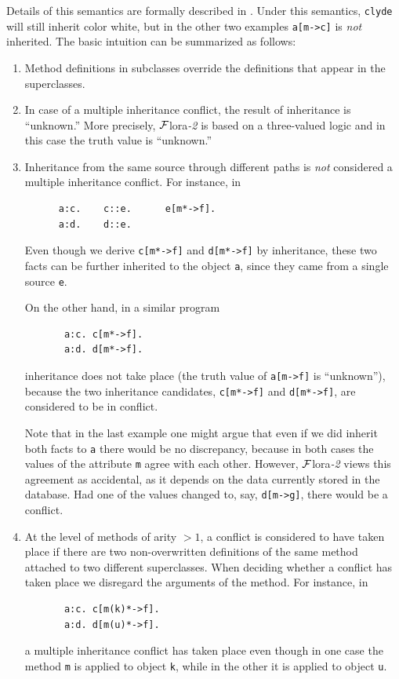 \documentclass[11pt]{article}
\newcommand{\FLORA}{{\mbox{\sc ${\cal F}${lora}\rm\emph{-2}}}\xspace}
\begin{document}
Details of this semantics are formally described in
\cite{inheritance-odbase-02}.  Under this semantics, {\tt clyde} will still
inherit color white, but in the other two examples {\tt a[m->c]} is
\emph{not} inherited.  The basic intuition can be summarized as follows:
\begin{enumerate}
\item  Method definitions in subclasses override the definitions that
  appear in the superclasses.
\item In case of a multiple inheritance conflict, the result of inheritance
  is ``unknown.'' More precisely, \FLORA is based on a three-valued logic and
  in this case the truth value is ``unknown.''
\item  Inheritance from the same source through different paths is
  \emph{not} considered a multiple inheritance conflict. For instance, in
  \begin{verbatim}
      a:c.    c::e.      e[m*->f].    
      a:d.    d::e.
  \end{verbatim}
  Even though we derive {\tt c[m*->f]} and {\tt d[m*->f]} by inheritance,
  these two facts can be further inherited to the object {\tt a}, since
  they came from a single source {\tt e}.

  On the other hand, in a similar program
  \begin{verbatim}
       a:c. c[m*->f].    
       a:d. d[m*->f].     
  \end{verbatim}
  inheritance does not take place (the truth value of {\tt a[m->f]} is
  ``unknown''), because the two inheritance candidates, {\tt c[m*->f]} and
  {\tt d[m*->f]}, are considered to be in conflict.

  Note that in the last example one might argue that even if we did inherit
  both facts to {\tt a} there would be no discrepancy, because in both
  cases the values of the attribute {\tt m} agree with each other.
  However, \FLORA views this agreement as accidental, as it depends on the
  data currently stored in the database. Had one of the values changed to, say,
  {\tt d[m->g]}, there would be a conflict.
  
\item At the level of methods of arity $>1$, a conflict is considered to have
  taken place if there are two non-overwritten definitions of the same method
  attached to two different superclasses. When deciding whether a conflict
  has taken place we disregard the arguments of the method. For instance, in
  \begin{verbatim}
       a:c. c[m(k)*->f].    
       a:d. d[m(u)*->f].     
  \end{verbatim}
  a multiple inheritance conflict has taken place even though in one case
  the method {\tt m} is applied to object {\tt k}, while in the other it is
  applied to object {\tt u}. 


\end{enumerate}
\end{document}
